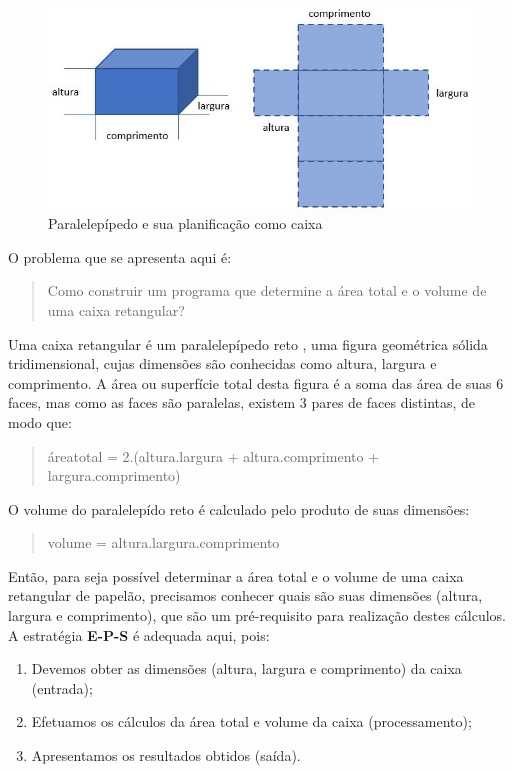 \documentclass[
]{book}
\providecommand{\tightlist}{%
  \setlength{\itemsep}{0pt}\setlength{\parskip}{0pt}}
\begin{document}
\begin{figure}
\centering
\includegraphics{images/04-03.jpg}
\caption{\label{fig:04-03}Paralelepípedo e sua planificação como caixa}
\end{figure}

O problema que se apresenta aqui é:

\begin{quote}
Como construir um programa que determine a área total e o volume de uma caixa retangular?
\end{quote}

Uma caixa retangular é um paralelepípedo reto \citep{gou2021}, uma figura geométrica sólida tridimensional, cujas dimensões são conhecidas como altura, largura e comprimento. A área ou superfície total desta figura é a soma das área de suas 6 faces, mas como as faces são paralelas, existem 3 pares de faces distintas, de modo que:

\begin{quote}
áreatotal = 2.(altura.largura + altura.comprimento + largura.comprimento)
\end{quote}

O volume do paralelepído reto é calculado pelo produto de suas dimensões:

\begin{quote}
volume = altura.largura.comprimento
\end{quote}

Então, para seja possível determinar a área total e o volume de uma caixa retangular de papelão, precisamos conhecer quais são suas dimensões (altura, largura e comprimento), que são um pré-requisito para realização destes cálculos. A estratégia \textbf{E-P-S} é adequada aqui, pois:

\begin{enumerate}
\def\labelenumi{\arabic{enumi}.}
\tightlist
\item
  Devemos obter as dimensões (altura, largura e comprimento) da caixa (entrada);
\item
  Efetuamos os cálculos da área total e volume da caixa (processamento);
\item
  Apresentamos os resultados obtidos (saída).
\end{enumerate}
\end{document}

